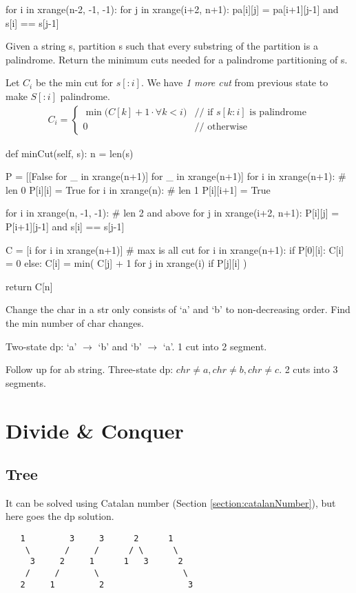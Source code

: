 {\begin{python}
for i in xrange(n-2, -1, -1):
    for j in xrange(i+2, n+1):
        pa[i][j] = pa[i+1][j-1] and s[i] == s[j-1]
\end{python}
 Given a string s, partition s such that every substring of the partition is a palindrome. Return the minimum cuts needed for a palindrome partitioning of s.

Let $C_i$ be the min cut for $s[:i]$. We have \textit{1 more cut} from previous state to make $S[:i]$ palindrome. 
\begin{eqnarray*}
C_{i} = \left\{ \begin{array}{rl}
  \min\big(C[k]+1 \cdot \forall k<i \big) &\mbox{// if $s[k:i]$ is palindrome}
\\
  0 &\mbox{// otherwise}
       \end{array} \right.
\end{eqnarray*}
\begin{python}
def minCut(self, s):
  n = len(s)

  P = [[False for _ in xrange(n+1)] for _ in xrange(n+1)]
  for i in xrange(n+1):  # len 0
    P[i][i] = True
  for i in xrange(n):  # len 1
    P[i][i+1] = True

  for i in xrange(n, -1, -1):  # len 2 and above
    for j in xrange(i+2, n+1):
      P[i][j] = P[i+1][j-1] and s[i] == s[j-1]

  C = [i for i in xrange(n+1)]  # max is all cut
  for i in xrange(n+1):
    if P[0][i]:
      C[i] = 0
    else:
      C[i] = min(
          C[j] + 1
          for j in xrange(i)
          if P[j][i]
      )

  return C[n]
\end{python}
 Change the char in a str only consists of `a' and `b' to non-decreasing order. Find the min number of char changes. 

Two-state dp: `a' $\rightarrow$ `b' and  `b' $\rightarrow$ `a'. 1 cut into 2 segment.

 Follow up for ab string. Three-state dp: $chr \neq a, chr \neq b, chr \neq c$. 2 cuts into 3 segments.

\section{Divide \& Conquer}
\subsection{Tree}
 It can be solved using Catalan number (Section \ref{section:catalanNumber}), but here goes the dp solution. 
\begin{lstlisting}
   1         3     3      2      1
    \       /     /      / \      \
     3     2     1      1   3      2
    /     /       \                 \
   2     1         2                 3
\end{lstlisting}

}
